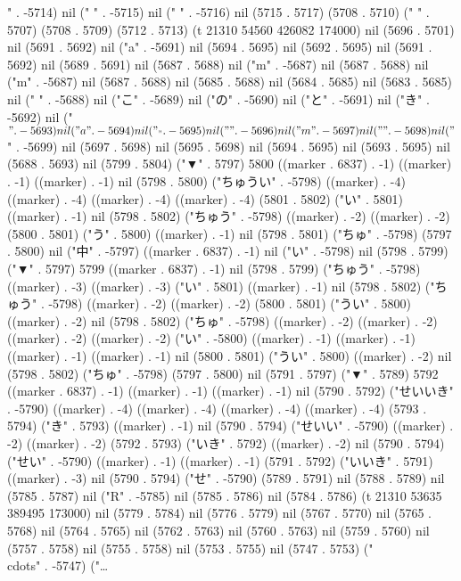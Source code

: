 " . -5714) nil (" " . -5715) nil (" " . -5716) nil (5715 . 5717) (5708 . 5710) (" " . 5707) (5708 . 5709) (5712 . 5713) (t 21310 54560 426082 174000) nil (5696 . 5701) nil (5691 . 5692) nil ("a" . -5691) nil (5694 . 5695) nil (5692 . 5695) nil (5691 . 5692) nil (5689 . 5691) nil (5687 . 5688) nil ("m" . -5687) nil (5687 . 5688) nil ("m" . -5687) nil (5687 . 5688) nil (5685 . 5688) nil (5684 . 5685) nil (5683 . 5685) nil (" " . -5688) nil ("こ" . -5689) nil ("の" . -5690) nil ("と" . -5691) nil ("き" . -5692) nil ("$" . -5693) nil ("a" . -5694) nil ("_" . -5695) nil ("{" . -5696) nil ("m" . -5697) nil ("}" . -5698) nil ("$" . -5699) nil (5697 . 5698) nil (5695 . 5698) nil (5694 . 5695) nil (5693 . 5695) nil (5688 . 5693) nil (5799 . 5804) ("▼" . 5797) 5800 ((marker . 6837) . -1) ((marker) . -1) ((marker) . -1) nil (5798 . 5800) ("ちゅうい" . -5798) ((marker) . -4) ((marker) . -4) ((marker) . -4) ((marker) . -4) (5801 . 5802) ("い" . 5801) ((marker) . -1) nil (5798 . 5802) ("ちゅう" . -5798) ((marker) . -2) ((marker) . -2) (5800 . 5801) ("う" . 5800) ((marker) . -1) nil (5798 . 5801) ("ちゅ" . -5798) (5797 . 5800) nil ("中" . -5797) ((marker . 6837) . -1) nil ("い" . -5798) nil (5798 . 5799) ("▼" . 5797) 5799 ((marker . 6837) . -1) nil (5798 . 5799) ("ちゅう" . -5798) ((marker) . -3) ((marker) . -3) ("い" . 5801) ((marker) . -1) nil (5798 . 5802) ("ちゅう" . -5798) ((marker) . -2) ((marker) . -2) (5800 . 5801) ("うい" . 5800) ((marker) . -2) nil (5798 . 5802) ("ちゅ" . -5798) ((marker) . -2) ((marker) . -2) ((marker) . -2) ((marker) . -2) ("い" . -5800) ((marker) . -1) ((marker) . -1) ((marker) . -1) ((marker) . -1) nil (5800 . 5801) ("うい" . 5800) ((marker) . -2) nil (5798 . 5802) ("ちゅ" . -5798) (5797 . 5800) nil (5791 . 5797) ("▼" . 5789) 5792 ((marker . 6837) . -1) ((marker) . -1) ((marker) . -1) nil (5790 . 5792) ("せいいき" . -5790) ((marker) . -4) ((marker) . -4) ((marker) . -4) ((marker) . -4) (5793 . 5794) ("き" . 5793) ((marker) . -1) nil (5790 . 5794) ("せいい" . -5790) ((marker) . -2) ((marker) . -2) (5792 . 5793) ("いき" . 5792) ((marker) . -2) nil (5790 . 5794) ("せい" . -5790) ((marker) . -1) ((marker) . -1) (5791 . 5792) ("いいき" . 5791) ((marker) . -3) nil (5790 . 5794) ("せ" . -5790) (5789 . 5791) nil (5788 . 5789) nil (5785 . 5787) nil ("R" . -5785) nil (5785 . 5786) nil (5784 . 5786) (t 21310 53635 389495 173000) nil (5779 . 5784) nil (5776 . 5779) nil (5767 . 5770) nil (5765 . 5768) nil (5764 . 5765) nil (5762 . 5763) nil (5760 . 5763) nil (5759 . 5760) nil (5757 . 5758) nil (5755 . 5758) nil (5753 . 5755) nil (5747 . 5753) ("\\cdots" . -5747) ("…
